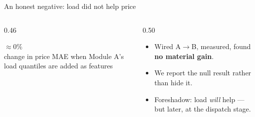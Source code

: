 \documentclass[aspectratio=169,11pt]{beamer}
\begin{document}
\begin{frame}{An honest negative: load did not help price}
  \vspace{0.3cm}
  \begin{columns}[T,onlytextwidth]
    \begin{column}{0.46\textwidth}
      \centering
      \colorbox{emisGrid!50}{\parbox[c][2.6cm][c]{0.9\linewidth}{\centering
        {\Large\bfseries\color{emisMuted} $\approx 0\%$}\\[4pt]
        {\small change in price MAE when Module A's load quantiles are added as features}}}
    \end{column}
    \begin{column}{0.50\textwidth}
      \small
      \begin{itemize}\setlength\itemsep{6pt}
        \item Wired A$\rightarrow$B, measured, found \textbf{no material gain}.
        \item We report the null result rather than hide it.
        \item Foreshadow: load \emph{will} help --- but later, at the dispatch stage.
      \end{itemize}
    \end{column}
  \end{columns}
\end{frame}
\end{document}

